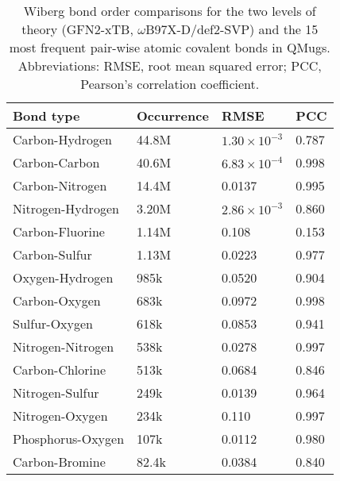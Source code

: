 \begin{table}[ht]
\caption{Wiberg bond order comparisons  for the two levels of theory (GFN2-xTB, $\omega$B97X-D/def2-SVP) and the 15 most frequent pair-wise atomic covalent bonds in QMugs. Abbreviations: RMSE, root mean squared error; PCC, Pearson's correlation coefficient.}
\centering
\begin{tabular}{@{}llll@{}}
\toprule
\textbf{Bond type} & \textbf{Occurrence} & \textbf{RMSE}     & \textbf{PCC} \\ \midrule
Carbon-Hydrogen      & 44.8M  & $1.30 \times 10^{-3}$    & 0.787         \\
Carbon-Carbon        & 40.6M  & $6.83\times 10^{-4}$ & 0.998        \\
Carbon-Nitrogen      & 14.4M  & 0.0137             & 0.995        \\
Nitrogen-Hydrogen    & 3.20M  & $2.86 \times 10^{-3}$    & 0.860        \\
Carbon-Fluorine      & 1.14M  & 0.108             & 0.153        \\
Carbon-Sulfur        & 1.13M  & 0.0223             & 0.977        \\
Oxygen-Hydrogen      & 985k  & 0.0520             & 0.904        \\
Carbon-Oxygen        & 683k  & 0.0972             & 0.998        \\
Sulfur-Oxygen        & 618k  & 0.0853             & 0.941         \\ 
Nitrogen-Nitrogen    & 538k  & 0.0278             & 0.997         \\
Carbon-Chlorine      & 513k  & 0.0684             & 0.846         \\
Nitrogen-Sulfur      & 249k  & 0.0139             & 0.964        \\
Nitrogen-Oxygen      & 234k  & 0.110             & 0.997        \\
Phosphorus-Oxygen    & 107k  & 0.0112             & 0.980         \\
Carbon-Bromine       & 82.4k  & 0.0384             & 0.840        \\\bottomrule
\end{tabular}%
\end{table}